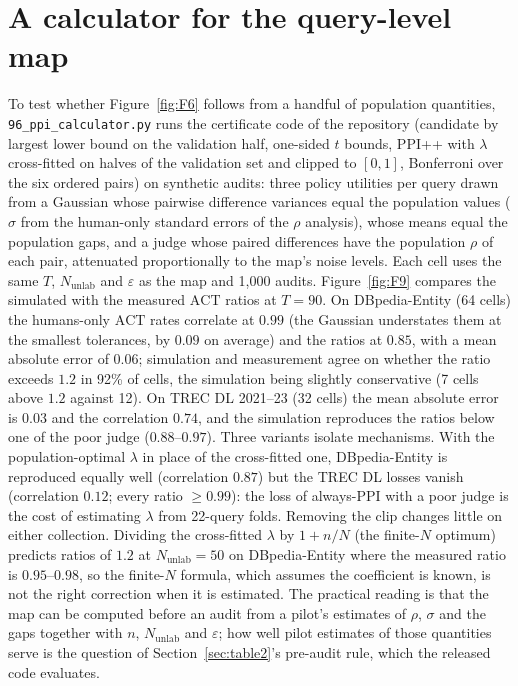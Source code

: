 \documentclass{article}
\newcommand{\eps}{\varepsilon}
\newcommand{\ACT}{\mathrm{ACT}}
\begin{document}
\section{A calculator for the query-level map}\label{app:calculator}
To test whether Figure~\ref{fig:F6} follows from a handful of population quantities, \texttt{96\_ppi\_calculator.py} runs the certificate code of the repository (candidate by largest lower bound on the validation half, one-sided $t$ bounds, PPI++ with $\lambda$ cross-fitted on halves of the validation set and clipped to $[0,1]$, Bonferroni over the six ordered pairs) on synthetic audits: three policy utilities per query drawn from a Gaussian whose pairwise difference variances equal the population values ($\sigma$ from the human-only standard errors of the $\rho$ analysis), whose means equal the population gaps, and a judge whose paired differences have the population $\rho$ of each pair, attenuated proportionally to the map's noise levels. Each cell uses the same $T$, $N_{\mathrm{unlab}}$ and $\eps$ as the map and 1{,}000 audits. Figure~\ref{fig:F9} compares the simulated with the measured $\ACT$ ratios at $T=90$. On DBpedia-Entity (64 cells) the humans-only $\ACT$ rates correlate at $0.99$ (the Gaussian understates them at the smallest tolerances, by $0.09$ on average) and the ratios at $0.85$, with a mean absolute error of $0.06$; simulation and measurement agree on whether the ratio exceeds $1.2$ in 92\% of cells, the simulation being slightly conservative (7 cells above $1.2$ against 12). On TREC DL 2021--23 (32 cells) the mean absolute error is $0.03$ and the correlation $0.74$, and the simulation reproduces the ratios below one of the poor judge ($0.88$--$0.97$). Three variants isolate mechanisms. With the population-optimal $\lambda$ in place of the cross-fitted one, DBpedia-Entity is reproduced equally well (correlation $0.87$) but the TREC DL losses vanish (correlation $0.12$; every ratio $\ge0.99$): the loss of always-PPI with a poor judge is the cost of estimating $\lambda$ from 22-query folds. Removing the clip changes little on either collection. Dividing the cross-fitted $\lambda$ by $1+n/N$ (the finite-$N$ optimum) predicts ratios of $1.2$ at $N_{\mathrm{unlab}}=50$ on DBpedia-Entity where the measured ratio is $0.95$--$0.98$, so the finite-$N$ formula, which assumes the coefficient is known, is not the right correction when it is estimated. The practical reading is that the map can be computed before an audit from a pilot's estimates of $\rho$, $\sigma$ and the gaps together with $n$, $N_{\mathrm{unlab}}$ and $\eps$; how well pilot estimates of those quantities serve is the question of Section~\ref{sec:table2}'s pre-audit rule, which the released code evaluates.
\end{document}
